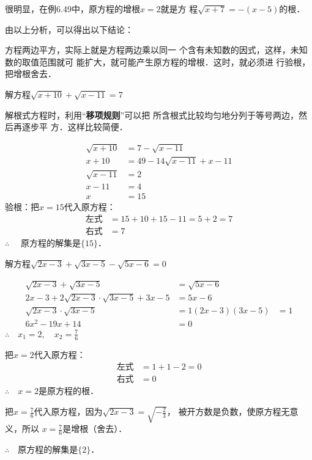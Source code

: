 很明显，在例6.49中，原方程的增根$x=2$就是方
程$\sqrt{x+7}=-(x-5)$的根．

由以上分析，可以得出以下结论：

\begin{blk}{}
    方程两边平方，实际上就是方程两边乘以同一
个含有未知数的因式，这样，未知数的取值范围就可
能扩大，就可能产生原方程的增根．这时，就必须进
行验根，把增根舍去．
\end{blk}



\begin{example}
    解方程$\sqrt{x+10}+\sqrt{x-11}=7$
\end{example}

\begin{analyze}
    解根式方程时，利用“\textbf{移项规则}”可以把
所含根式比较均匀地分列于等号两边，然后再逐步平
方．这样比较简便．
\end{analyze}


\begin{solution}
\begin{align*}
    \sqrt{x+10}&=7-\sqrt{x-11}\tag{移项}\\
x+10&=49-14\sqrt{x-11}+x-11  \tag{两边平方}\\
\sqrt{x-11}&=2\\
x-11&=4 \tag{两边平方}\\
x&=15
\end{align*}
验根：把$x=15$代入原方程：
\[\begin{split}
    \text{左式}&=15+10+15-11=5+2=7\\
    \text{右式}&=7
\end{split}\]
$\therefore\quad $
原方程的解集是$\{15\}$．
\end{solution}

\begin{example}
    解方程$\sqrt{2x-3}+\sqrt{3x-5}-\sqrt{5x-6}=0$
\end{example}

\begin{solution}
\begin{align*}
    \sqrt{2x-3}+\sqrt{3x-5}&=\sqrt{5x-6}  \tag{移项}\\
2x-3+2\sqrt{2x-3}\cdot \sqrt{3x-5}+3x-5&=5x-6  \tag{两边平方}\\
\sqrt{2x-3}\cdot \sqrt{3x-5}&=1
(2x-3)(3x-5)&=1   \tag{两边平方}\\
6x^2-19x+14&=0
\end{align*}
$\therefore\quad x_1=2,\quad x_2=\frac{7}{6}$

把$x=2$代入原方程：
\[\begin{split}
    \text{左式}&=1+1-2=0\\
    \text{右式}&=0
\end{split}\]
$\therefore\quad x=2$是原方程的根．

把$x=\frac{7}{6}$代入原方程，因为$\sqrt{2x-3}=\sqrt{-\frac{2}{3}}$，
被开方数是负数，使原方程无意义，所以
$x=\frac{7}{6}$是增根（舍去）．

$\therefore\quad $原方程的解集是$\{2\}$．
\end{solution}

